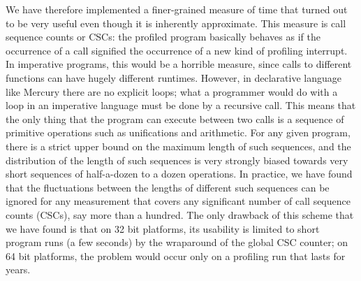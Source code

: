 We have therefore implemented a finer-grained measure of time
that turned out to be very useful
even though it is inherently approximate.
This measure is call sequence counts or CSCs:
the profiled program basically behaves
as if the occurrence of a call signified
the occurrence of a new kind of profiling interrupt.
In imperative programs, this would be a horrible measure,
since calls to different functions can have hugely different runtimes.
However, in declarative language like Mercury there are no explicit loops;
what a programmer would do with a loop in an imperative language
must be done by a recursive call.
This means that the only thing that the program can execute between two calls
is a sequence of primitive operations such as unifications and arithmetic.
For any given program,
there is a strict upper bound on the maximum length of such sequences,
and the distribution of the length of such sequences
is very strongly biased towards very short sequences
of half-a-dozen to a dozen operations.
In practice, we have found that
the fluctuations between the lengths of different such sequences
can be ignored for any measurement
that covers any significant number of call sequence counts (CSCs),
say more than a hundred.
The only drawback of this scheme that we have found
is that on 32 bit platforms,
its usability is limited to short program runs (a few seconds)
by the wraparound of the global CSC counter;
on 64 bit platforms, the problem would occur
only on a profiling run that lasts for years.

